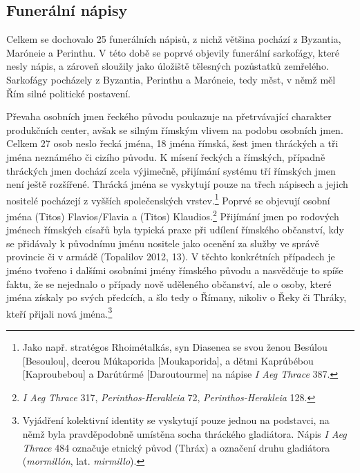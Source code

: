 \subsection[funerální-nápisy-11]{Funerální nápisy}

Celkem se dochovalo 25 funerálních nápisů, z nichž většina pochází z Byzantia, Maróneie a Perinthu. V této době se poprvé objevily funerální sarkofágy, které nesly nápis, a zároveň sloužily jako úložiště tělesných pozůstatků zemřelého. Sarkofágy pocházely z Byzantia, Perinthu a Maróneie, tedy měst, v němž měl Řím silné politické postavení.

Převaha osobních jmen řeckého původu poukazuje na přetrvávající charakter produkčních center, avšak se silným římským vlivem na podobu osobních jmen. Celkem 27 osob neslo řecká jména, 18 jména římská, šest jmen thráckých a tři jména neznámého či cizího původu. K mísení řeckých a římských, případně thráckých jmen dochází zcela výjimečně, přijímání systému tří římských jmen není ještě rozšířené. Thrácká jména se vyskytují pouze na třech nápisech a jejich nositelé pocházejí z vyšších společenských vrstev.\footnote{Jako např. stratégos Rhoimétalkás, syn Diasenea se svou ženou Besúlou {[}Besoulou{]}, dcerou Múkaporida {[}Moukaporida{]}, a dětmi Kaprúbébou {[}Kaproubebou{]} a Darútúrmé {[}Daroutourme{]} na nápise {\em I Aeg Thrace} 387.} Poprvé se objevují osobní jména (Titos) Flavios/Flavia a (Titos) Klaudios.\footnote{{\em I Aeg Thrace} 317, {\em Perinthos-Herakleia} 72, {\em Perinthos-Herakleia} 128.} Přijímání jmen po rodových jménech římských císařů byla typická praxe při udílení římského občanství, kdy se přidávaly k původnímu jménu nositele jako ocenění za služby ve správě provincie či v armádě (Topalilov 2012, 13). V těchto konkrétních případech je jméno tvořeno i dalšími osobními jmény římského původu a nasvědčuje to spíše faktu, že se nejednalo o případy nově uděleného občanství, ale o osoby, které jména získaly po svých předcích, a šlo tedy o Římany, nikoliv o Řeky či Thráky, kteří přijali nová jména.\footnote{Vyjádření kolektivní identity se vyskytují pouze jednou na podstavci, na němž byla pravděpodobně umístěna socha thráckého gladiátora. Nápis {\em I Aeg Thrace} 484 označuje etnický původ (Thráx) a označení druhu gladiátora ({\em mormillón}, lat. {\em mirmillo}).}

